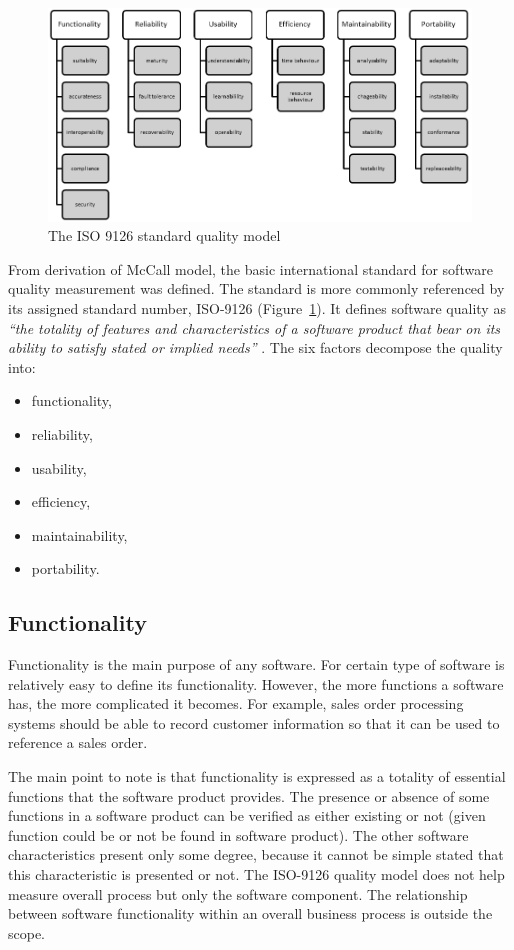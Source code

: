 \begin{figure}[h!]
	\centering
	\includegraphics[scale=0.6]{img/diag.png} 
	\caption{The ISO 9126 standard quality model}		
	\label{fig:iso9126}
\end{figure}

From derivation of McCall model, the basic international standard for software quality measurement was defined. The standard is more commonly referenced by its assigned standard number, ISO-9126 (Figure~\ref{fig:iso9126}). It defines software quality as\textit{ ``the totality of features and characteristics of a software product that bear on its ability to satisfy stated or implied needs''} \cite{ISO9126}. The six factors decompose the quality into: 

\begin{itemize}
  \item functionality, 
  \item reliability,
  \item usability,
  \item efficiency,
  \item maintainability,
  \item portability.   
  \end{itemize}
    
\subsection{Functionality}
Functionality is the main purpose of any software. For certain type of software is relatively easy to define its functionality. However, the more functions a software has, the more complicated it becomes. For example, sales order processing systems should be able to record customer information so that it can be used to reference a sales order.

The main point to note is that functionality is expressed as a totality of essential functions that the software product provides. The presence or absence of some functions in a software product can be verified as either existing or not (given function could be or not be found in software product). The other software characteristics present only some degree, because it cannot be simple stated that this characteristic is presented or not. The ISO-9126 quality model does not help measure overall process but only the software component. The relationship between software functionality within an overall business process is outside the scope.

